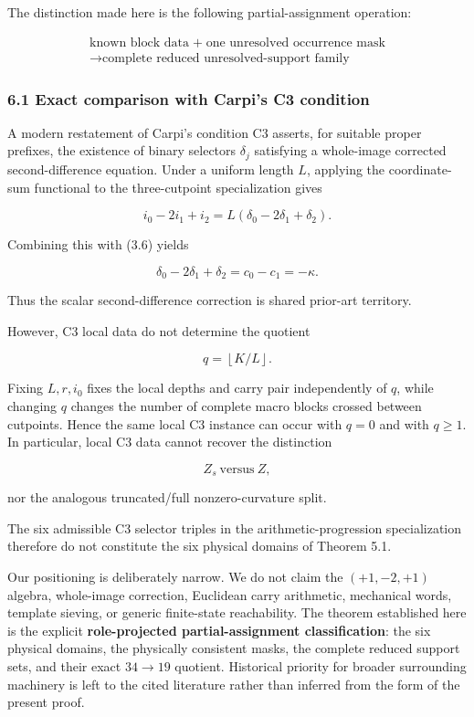 \documentclass[
  british,
  a4paper,
  11pt]{article}
\begin{document}
The distinction made here is the following partial-assignment operation:

\[
\begin{gathered}
\text{known block data}
\; + \;
\text{one unresolved occurrence mask}\\
\longrightarrow
\text{complete reduced unresolved-support family}
\end{gathered}
\]

\subsubsection{6.1 Exact comparison with Carpi's C3
condition}\label{exact-comparison-with-carpis-c3-condition}

A modern restatement of Carpi's condition C3 asserts, for suitable
proper prefixes, the existence of binary selectors \(\delta_j\)
satisfying a whole-image corrected second-difference equation. Under a
uniform length \(L\), applying the coordinate-sum functional to the
three-cutpoint specialization gives

\[
i_0-2i_1+i_2
=
L(\delta_0-2\delta_1+\delta_2).
\]

Combining this with (3.6) yields

\[
\boxed{
\delta_0-2\delta_1+\delta_2
=
c_0-c_1
=
-\kappa.
}
\tag{6.1}
\]

Thus the scalar second-difference correction is shared prior-art
territory.

However, C3 local data do not determine the quotient

\[
q=\left\lfloor K/L\right\rfloor.
\]

Fixing \(L,r,i_0\) fixes the local depths and carry pair independently
of \(q\), while changing \(q\) changes the number of complete macro
blocks crossed between cutpoints. Hence the same local C3 instance can
occur with \(q=0\) and with \(q\ge1\). In particular, local C3 data
cannot recover the distinction

\[
Z_s\ \text{versus}\ Z,
\]

nor the analogous truncated/full nonzero-curvature split.

The six admissible C3 selector triples in the arithmetic-progression
specialization therefore do not constitute the six physical domains of
Theorem 5.1.

Our positioning is deliberately narrow. We do not claim the
\((+1,-2,+1)\) algebra, whole-image correction, Euclidean carry
arithmetic, mechanical words, template sieving, or generic finite-state
reachability. The theorem established here is the explicit
\textbf{role-projected partial-assignment classification}: the six
physical domains, the physically consistent masks, the complete reduced
support sets, and their exact \(34\to19\) quotient. Historical priority
for broader surrounding machinery is left to the cited literature rather
than inferred from the form of the present proof.
\end{document}
